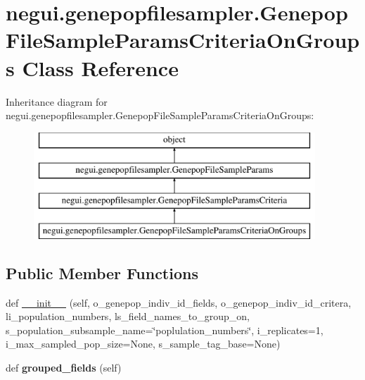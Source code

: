 \hypertarget{classnegui_1_1genepopfilesampler_1_1GenepopFileSampleParamsCriteriaOnGroups}{}\section{negui.\+genepopfilesampler.\+Genepop\+File\+Sample\+Params\+Criteria\+On\+Groups Class Reference}
\label{classnegui_1_1genepopfilesampler_1_1GenepopFileSampleParamsCriteriaOnGroups}
Inheritance diagram for negui.\+genepopfilesampler.\+Genepop\+File\+Sample\+Params\+Criteria\+On\+Groups\+:\begin{figure}[H]
\begin{center}
\leavevmode
\includegraphics[height=4.000000cm]{classnegui_1_1genepopfilesampler_1_1GenepopFileSampleParamsCriteriaOnGroups}
\end{center}
\end{figure}
\subsection*{Public Member Functions}
\begin{DoxyCompactItemize}
\item 
def \hyperlink{classnegui_1_1genepopfilesampler_1_1GenepopFileSampleParamsCriteriaOnGroups_ab9e717598c2781a095bfb169b3457879}{\+\_\+\+\_\+init\+\_\+\+\_\+} (self, o\+\_\+genepop\+\_\+indiv\+\_\+id\+\_\+fields, o\+\_\+genepop\+\_\+indiv\+\_\+id\+\_\+critera, li\+\_\+population\+\_\+numbers, ls\+\_\+field\+\_\+names\+\_\+to\+\_\+group\+\_\+on, s\+\_\+population\+\_\+subsample\+\_\+name=\char`\"{}poplulation\+\_\+numbers\char`\"{}, i\+\_\+replicates=1, i\+\_\+max\+\_\+sampled\+\_\+pop\+\_\+size=None, s\+\_\+sample\+\_\+tag\+\_\+base=None)
\item 
def {\bfseries grouped\+\_\+fields} (self)\hypertarget{classnegui_1_1genepopfilesampler_1_1GenepopFileSampleParamsCriteriaOnGroups_aa7daa9e80fe3fedf4ef2303b035fead2}{}\label{classnegui_1_1genepopfilesampler_1_1GenepopFileSampleParamsCriteriaOnGroups_aa7daa9e80fe3fedf4ef2303b035fead2}

\end{DoxyCompactItemize}


